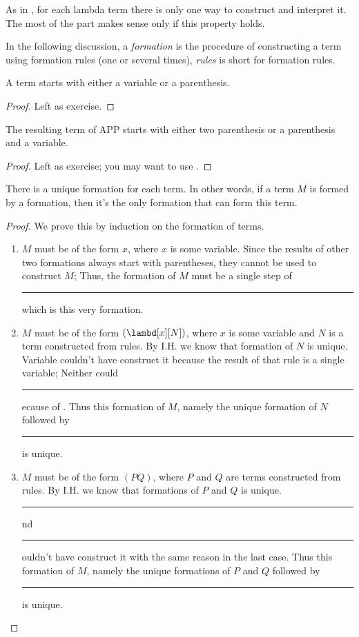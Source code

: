 \documentclass[../../../include/open-logic-section]{subfiles}
\begin{document}

As in \olref[fol][syn][unq], for each lambda term there is only one
way to construct and interpret it. The most of the part makes
sense only if this property holds.

In the following discussion, a \emph{formation} is the procedure of
constructing a term using formation rules (one or several times), \emph{rules} is short for
formation rules. 

\begin{lem}
  A term starts with either a variable or a parenthesis.
\end{lem}
\begin{proof}
  Left as exercise.
\end{proof}

\begin{lem}
  The resulting term of APP starts with either two parenthesis or a
  parenthesis and a variable.
\end{lem}
\begin{proof}
  Left as exercise; you may want to use .
\end{proof}

\begin{prop} 
There is a unique formation for each term. In other words, if a term
$M$ is formed by a formation, then it's the only formation that can form this term.
\end{prop}

\begin{proof}
  We prove this by induction on the formation of terms. 

  \begin{enumerate}
    \item[\rule{VAR}] $M$ must be of the form
      $x$, where $x$ is some variable. Since the results of other two
      formations always start with parentheses, they cannot be used to
      construct $M$; Thus, the formation of $M$ must be a single step
      of \rule{VAR}, which is this very formation.
    \item[\rule{ABS}] $M$ must be of the
      form $(\lambd[x][N])$, where $x$ is some variable and $N$ is a
      term constructed from rules. By I.H. we know that formation of
      $N$ is unique. Variable couldn't have construct it
      because the result of that rule is a single variable;
      Neither could \rule{APP} because of . Thus
      this formation of $M$, namely the unique formation of $N$
      followed by \rule{ABS}, is unique.

    \item[\rule{APP}] $M$ must be of the form
      $(PQ)$, where $P$ and $Q$ are terms constructed from rules. By
      I.H. we know that formations of $P$ and $Q$ is unique. \rule{VAR} and
      \rule{ABS} couldn't have construct it with the same reason in the 
      last case. Thus this formation of $M$, namely the unique
      formations of $P$ and $Q$ followed by \rule{APP}, is unique.
  \end{enumerate}
\end{proof}
\end{document}
